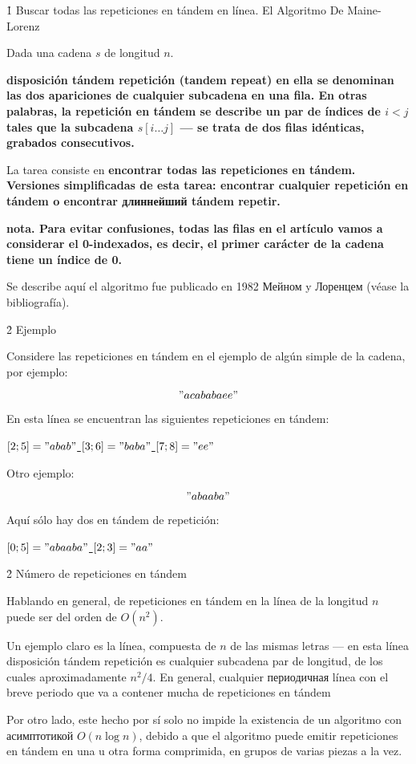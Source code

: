 \h1{ Buscar todas las repeticiones en tándem en línea. El Algoritmo De Maine-Lorenz }

Dada una cadena $s$ de longitud $n$.

\bf{disposición tándem repetición} (tandem repeat) en ella se denominan las dos apariciones de cualquier subcadena en una fila. En otras palabras, la repetición en tándem se describe un par de índices de $i < j$ tales que la subcadena $s[i \ldots j]$ --- se trata de dos filas idénticas, grabados consecutivos.

La tarea consiste en \bf{encontrar todas las repeticiones en tándem}. Versiones simplificadas de esta tarea: encontrar \bf{cualquier} repetición en tándem o encontrar \bf{длиннейший} tándem repetir.

\bf{nota}. Para evitar confusiones, todas las filas en el artículo vamos a considerar el 0-indexados, es decir, el primer carácter de la cadena tiene un índice de 0.

Se describe aquí el algoritmo fue publicado en 1982 Мейном y Лоренцем (véase la bibliografía).


\h2{ Ejemplo }

Considere las repeticiones en tándem en el ejemplo de algún simple de la cadena, por ejemplo:

$$ "acababaee" $$

En esta línea se encuentran las siguientes repeticiones en tándem:

\ul{
\li $[2;5] = "abab"$
\li $[3;6] = "baba"$
\li $[7;8] = "ee"$
}

Otro ejemplo:

$$ "abaaba" $$

Aquí sólo hay dos en tándem de repetición:

\ul{
\li $[0;5] = "abaaba"$
\li $[2;3] = "aa"$
}


\h2{ Número de repeticiones en tándem }

Hablando en general, de repeticiones en tándem en la línea de la longitud $n$ puede ser del orden de $O(n^2)$.

Un ejemplo claro es la línea, compuesta de $n$ de las mismas letras --- en esta línea disposición tándem repetición es cualquier subcadena par de longitud, de los cuales aproximadamente $n^2 / 4$. En general, cualquier периодичная línea con el breve periodo que va a contener mucha de repeticiones en tándem

Por otro lado, este hecho por sí solo no impide la existencia de un algoritmo con асимптотикой $O (n \log n)$, debido a que el algoritmo puede emitir repeticiones en tándem en una u otra forma comprimida, en grupos de varias piezas a la vez.

